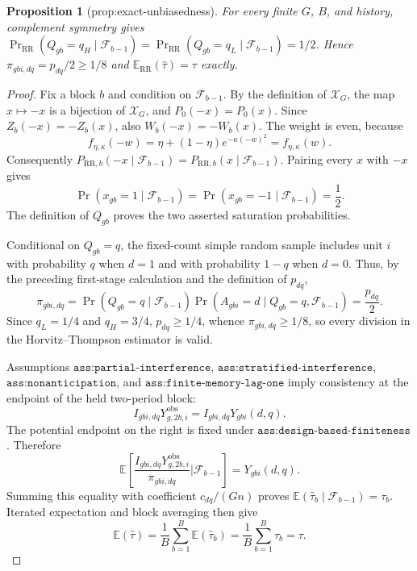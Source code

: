 \documentclass{article}
\newtheorem{proposition}{Proposition}
\begin{document}
\begin{proposition}[prop:exact-unbiasedness]\label{prop:exact-unbiasedness}
For every finite \(G\), \(B\), and history, complement symmetry gives \(\Pr_{\mathrm{RR}}(Q_{gb}=q_H\mid\mathcal F_{b-1})=\Pr_{\mathrm{RR}}(Q_{gb}=q_L\mid\mathcal F_{b-1})=1/2\). Hence \(\pi_{gbi,dq}=p_{dq}/2\geq1/8\) and \(\mathbb E_{\mathrm{RR}}(\widehat\tau)=\tau\) exactly.
\end{proposition}
\begin{proof}
Fix a block \(b\) and condition on \(\mathcal F_{b-1}\).  By the definition of \(\mathcal X_G\), the map \(x\mapsto-x\) is a bijection of \(\mathcal X_G\), and \(P_0(-x)=P_0(x)\).  Since \(Z_b(-x)=-Z_b(x)\), also \(W_b(-x)=-W_b(x)\).  The weight is even, because
\[
 f_{\eta,\kappa}(-w)=\eta+(1-\eta)e^{-\kappa(-w)^2}=f_{\eta,\kappa}(w).
\]
Consequently \(P_{\mathrm{RR},b}(-x\mid\mathcal F_{b-1})=P_{\mathrm{RR},b}(x\mid\mathcal F_{b-1})\).  Pairing every \(x\) with \(-x\) gives
\[
 \Pr(x_{gb}=1\mid\mathcal F_{b-1})
 =\Pr(x_{gb}=-1\mid\mathcal F_{b-1})=\frac12.
\]
The definition of \(Q_{gb}\) proves the two asserted saturation probabilities.

Conditional on \(Q_{gb}=q\), the fixed-count simple random sample includes unit \(i\) with probability \(q\) when \(d=1\) and with probability \(1-q\) when \(d=0\).  Thus, by the preceding first-stage calculation and the definition of \(p_{dq}\),
\[
 \pi_{gbi,dq}
 =\Pr(Q_{gb}=q\mid\mathcal F_{b-1})
   \Pr(A_{gbi}=d\mid Q_{gb}=q,\mathcal F_{b-1})
 =\frac{p_{dq}}2.
\]
Since \(q_L=1/4\) and \(q_H=3/4\), \(p_{dq}\geq1/4\), whence \(\pi_{gbi,dq}\geq1/8\), so every division in the Horvitz--Thompson estimator is valid.

Assumptions \(\texttt{ass:partial-interference}\), \(\texttt{ass:stratified-interference}\), \(\texttt{ass:nonanticipation}\), and \(\texttt{ass:finite-memory-lag-one}\) imply consistency at the endpoint of the held two-period block:
\[
 I_{gbi,dq}Y^{\mathrm{obs}}_{g,2b,i}
 =I_{gbi,dq}Y_{gbi}(d,q).
\]
The potential endpoint on the right is fixed under \(\texttt{ass:design-based-finiteness}\).  Therefore
\[
 \mathbb E\!\left[
   \frac{I_{gbi,dq}Y^{\mathrm{obs}}_{g,2b,i}}{\pi_{gbi,dq}}
   \mathrel{\bigg|}\mathcal F_{b-1}\right]
 =Y_{gbi}(d,q).
\]
Summing this equality with coefficient \(c_{dq}/(Gn)\) proves
\(\mathbb E(\widehat\tau_b\mid\mathcal F_{b-1})=\tau_b\).  Iterated expectation and block averaging then give
\[
 \mathbb E(\widehat\tau)
 =\frac1B\sum_{b=1}^B\mathbb E(\widehat\tau_b)
 =\frac1B\sum_{b=1}^B\tau_b=\tau.
\]
\end{proof}
\end{document}
